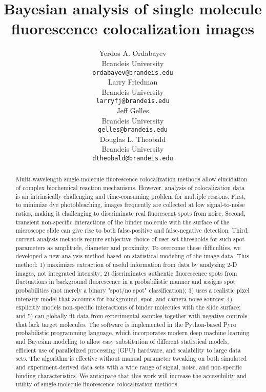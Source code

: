 \documentclass{article}
\title{Bayesian analysis of single molecule fluorescence  colocalization images}
\author{
 Yerdos A. Ordabayev \\
  Brandeis University\\
  \texttt{ordabayev@brandeis.edu} \\
   \And
 Larry Friedman \\
  Brandeis University\\
  \texttt{larryfj@brandeis.edu} \\
  \And
 Jeff Gelles \\
  Brandeis University\\
  \texttt{gelles@brandeis.edu} \\
  \And
 Douglas L. Theobald \\
  Brandeis University\\
  \texttt{dtheobald@brandeis.edu} \\
}
\begin{document}
\maketitle
\begin{abstract} %
Multi-wavelength single-molecule fluorescence colocalization methods allow elucidation of complex biochemical reaction mechanisms. However, analysis of colocalization data is an intrinsically challenging and time-consuming problem for multiple reasons. First, to minimize dye photobleaching, images frequently are collected at low signal-to-noise ratios, making it challenging to discriminate real fluorescent spots from noise. Second, transient non-specific interactions of the binder molecule with the surface of the microscope slide can give rise to both false-positive and false-negative detection. Third, current analysis methods require subjective choice of user-set thresholds for such spot parameters as amplitude, diameter and proximity. To overcome these difficulties, we developed a new analysis method based on statistical modeling of the image data. This method: 1) maximizes extraction of useful information from data by analyzing 2-D images, not integrated intensity; 2) discriminates authentic fluorescence spots from fluctuations in background fluorescence in a probabilistic manner and assigns spot probabilities (not merely a binary "spot/no spot" classification); 3) uses a realistic pixel intensity model that accounts for background, spot, and camera noise sources; 4) explicitly models non-specific interactions of binder molecules with the slide surface; and 5) can globally fit data from experimental samples together with negative controls that lack target molecules. The software is implemented in the Python-based Pyro probabilistic programming language, which incorporates modern deep machine learning and Bayesian modeling to allow easy substitution of different statistical models, efficient use of parallelized processing (GPU) hardware, and scalability to large data sets. The algorithm is effective without manual parameter tweaking on both simulated and experiment-derived data sets with a wide range of signal, noise, and non-specific binding characteristics. We anticipate that this work will increase the accessibility and utility of single-molecule fluorescence colocalization methods.
\end{abstract}











%








\end{document}
